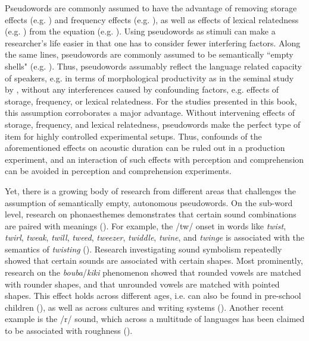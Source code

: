 Pseudowords are commonly assumed to have the advantage of removing storage effects (e.g. \cite{Caselli2016}) and frequency effects (e.g. \cite{Gahl2008, Lohmann2018}), as well as effects of lexical relatedness (e.g. \cite{Schriefers1998}) from the equation (e.g. \cite{Turcsan2015}). Using pseudowords as stimuli can make a researcher’s life easier in that one has to consider fewer interfering factors. Along the same lines, pseudowords are commonly assumed to be semantically ``empty shells" (e.g. \cite{Guenther1983, Frisch2000, Turcsan2015}). Thus, pseudowords assumably reflect the language related capacity of speakers, e.g. in terms of morphological productivity as in the seminal study by \citet{Berko1958}, without any interferences caused by confounding factors, e.g. effects of storage, frequency, or lexical relatedness. For the studies presented in this book, this assumption corroborates a major advantage. Without intervening effects of storage, frequency, and lexical relatedness, pseudowords make the perfect type of item for highly controlled experimental setups. Thus, confounds of the aforementioned effects on acoustic duration can be ruled out in a production experiment, and an interaction of such effects with perception and comprehension can be avoided in perception and comprehension experiments.

Yet, there is a growing body of research from different areas that challenges the assumption of semantically empty, autonomous pseudowords. On the sub-word level, research on phonaesthemes demonstrates that certain sound combinations are paired with meanings (\cite{Bergen2004, Kwon2015}). For example, the /tw/ onset in words like \textit{twist}, \textit{twirl}, \textit{tweak}, \textit{twill}, \textit{tweed}, \textit{tweezer}, \textit{twiddle}, \textit{twine}, and \textit{twinge} is associated with the semantics of \textit{twisting} (\cite{Bolinger1950}). Research investigating sound symbolism repeatedly showed that certain sounds are associated with certain shapes. Most prominently, research on the \textit{bouba}/\textit{kiki} phenomenon showed that rounded vowels are matched with rounder shapes, and that unrounded vowels are matched with pointed shapes. This effect holds across different ages, i.e. can also be found in pre-school children (\cite{Maurer2006}), as well as across cultures and writing systems (\cite{Cwiek2022}). Another recent example is the /r/ sound, which across a multitude of languages has been claimed to be associated with roughness (\cite{Winter2022}).

